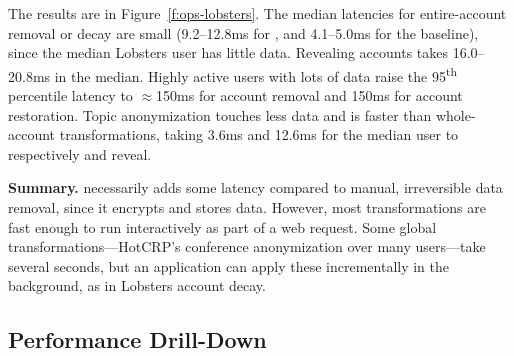 %
The results are in Figure~\ref{f:ops-lobsters}.
%
The median latencies for entire-account removal or decay are small (9.2--12.8ms
for \sys, and 4.1--5.0ms for the baseline), since the median Lobsters user has
little data. Revealing \xxed accounts takes 16.0--20.8ms in the median.
%
Highly active users with lots of data raise the 95\textsuperscript{th}
percentile latency to $\approx$150ms for account removal and 150ms for account
restoration.
%
Topic anonymization touches less data and is faster than whole-account
transformations, taking 3.6ms and 12.6ms for the median user to respectively \xx
and reveal.
%

\textbf{Summary.}
%
\sys necessarily adds some latency compared to manual, irreversible data
removal, since it encrypts and stores \xxed data.
%
However, most \xxing transformations are fast enough to run interactively as
part of a web request.
%
Some global \xxing transformations---\eg HotCRP's conference anonymization over
many users---take several seconds, but an application can apply these
incrementally in the background, as in Lobsters account decay.
%

\subsection{\sys Performance Drill-Down}
\label{s:eval-additional}

